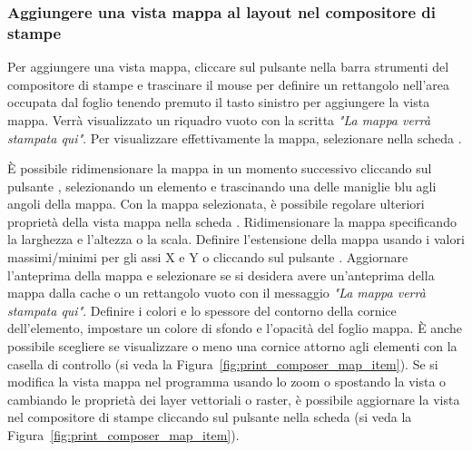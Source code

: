 \subsubsection{Aggiungere una vista mappa al layout nel compositore di
stampe}

Per aggiungere una vista mappa, cliccare sul pulsante
 nella barra strumenti
del compositore di stampe e trascinare il mouse per definire un rettangolo
nell'area occupata dal foglio tenendo premuto il tasto sinistro per aggiungere
la vista mappa. Verrà visualizzato un riquadro vuoto con la scritta
\textit{"La mappa verrà stampata qui"}. Per visualizzare effettivamente la mappa,
selezionare  nella scheda .


È possibile ridimensionare la mappa in un momento successivo cliccando sul
pulsante , selezionando
un elemento e trascinando una delle maniglie blu agli angoli della mappa. Con
la mappa selezionata, è possibile regolare ulteriori proprietà della vista
mappa nella scheda . Ridimensionare la mappa specificando la
larghezza e l'altezza o la scala. Definire l'estensione della mappa usando i
valori massimi/minimi per gli assi X e Y o cliccando sul pulsante
. Aggiornare l'anteprima della
mappa e selezionare se si desidera avere un'anteprima della mappa dalla cache
o un rettangolo vuoto con il messaggio \textit{"La mappa verrà stampata qui"}.
Definire i colori e lo spessore del contorno della cornice dell'elemento,
impostare un colore di sfondo e l'opacità del foglio mappa. È anche possibile
scegliere se visualizzare o meno una cornice attorno agli elementi con la
casella di controllo  (si veda la
Figura~\ref{fig:print_composer_map_item}). Se si modifica la vista mappa nel
programma usando lo zoom o spostando la vista o cambiando le proprietà dei layer
vettoriali o raster, è possibile aggiornare la vista nel compositore di
stampe cliccando sul pulsante  nella scheda
 (si veda la Figura~\ref{fig:print_composer_map_item}). 

